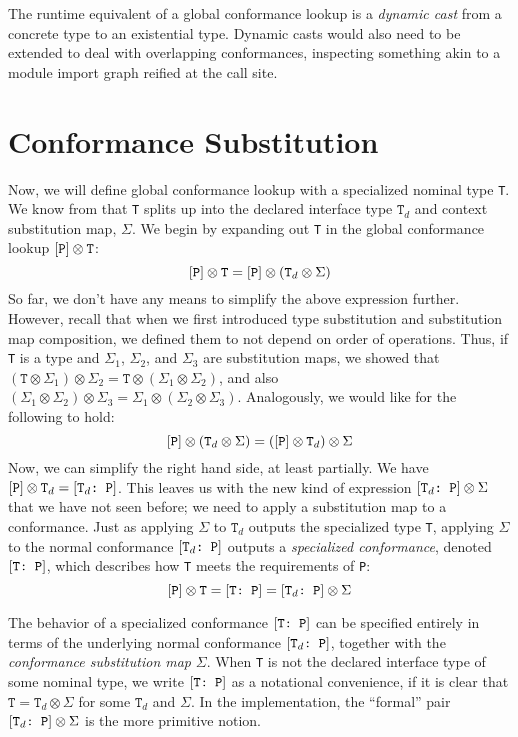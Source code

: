\documentclass[../generics]{subfiles}
\begin{document}
The runtime equivalent of a global conformance lookup is a \emph{dynamic cast} from a concrete type to an existential type. Dynamic casts would also need to be extended to deal with overlapping conformances, inspecting something akin to a module import graph reified at the call site.

\section{Conformance Substitution}\label{conformance subst}

Now, we will define global conformance lookup with a specialized nominal type \texttt{T}. We know from  that \texttt{T} splits up into the declared interface type $\texttt{T}_d$ and context substitution map, $\Sigma$. We begin by expanding out \texttt{T} in the global conformance lookup $[\texttt{P}]\otimes\texttt{T}$:
\[
[\texttt{P}]\otimes\texttt{T} = [\texttt{P}] \otimes (\texttt{T}_d \otimes \Sigma)
\]
So far, we don't have any means to simplify the above expression further. However, recall that when we first introduced type substitution and substitution map composition, we defined them to not depend on order of operations. Thus, if \texttt{T} is a type and $\Sigma_1$, $\Sigma_2$, and $\Sigma_3$ are substitution maps, we showed that $(\texttt{T}\otimes\Sigma_1)\otimes\Sigma_2=\texttt{T}\otimes(\Sigma_1\otimes\Sigma_2)$, and also $(\Sigma_1\otimes\Sigma_2)\otimes\Sigma_3=\Sigma_1\otimes(\Sigma_2\otimes\Sigma_3)$. Analogously, we would like for the following to hold:
\[
[\texttt{P}] \otimes (\texttt{T}_d \otimes \Sigma) = ([\texttt{P}] \otimes \texttt{T}_d) \otimes \Sigma
\]
Now, we can simplify the right hand side, at least partially. We have $[\texttt{P}]\otimes\texttt{T}_d=[\texttt{$\texttt{T}_d$:~P}]$. This leaves us with the new kind of expression $[\texttt{$\texttt{T}_d$:~P}]\otimes\Sigma$ that we have not seen before; we need to apply a substitution map to a conformance. Just as applying $\Sigma$ to $\texttt{T}_d$ outputs the specialized type \texttt{T}, applying $\Sigma$ to the normal conformance $[\texttt{$\texttt{T}_d$:~P}]$ outputs a \emph{specialized conformance}, denoted $[\texttt{T:~P}]$, which describes how \texttt{T} meets the requirements of \texttt{P}:
\[[\texttt{P}]\otimes\texttt{T}=[\texttt{T:~P}]=[\texttt{$\texttt{T}_d$:~P}]\otimes\Sigma\]

The behavior of a specialized conformance $[\texttt{T:~P}]$ can be specified entirely in terms of the underlying normal conformance $[\texttt{$\texttt{T}_d$:~P}]$, together with the \emph{conformance substitution map} $\Sigma$. When \texttt{T} is not the declared interface type of some nominal type, we write $[\texttt{T:~P}]$ as a notational convenience, if it is clear that $\texttt{T}=\texttt{T}_d\otimes\Sigma$ for some $\texttt{T}_d$ and $\Sigma$. In the implementation, the ``formal'' pair $[\texttt{$\texttt{T}_d$:~P}]\otimes\Sigma$ is the more primitive notion.
\end{document}
